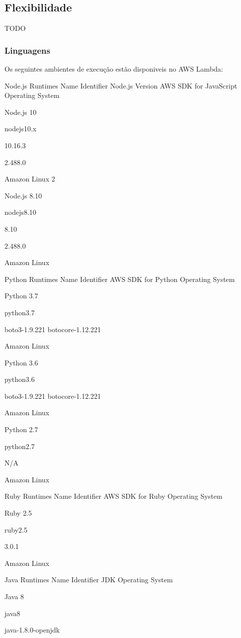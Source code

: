 \subsection{Flexibilidade}

TODO

\subsubsection{Linguagens}

Os seguintes ambientes de execução estão disponiveis no AWS Lambda:

Node.js Runtimes
Name	Identifier	Node.js Version 	AWS SDK for JavaScript
Operating System

Node.js 10

nodejs10.x

10.16.3

2.488.0

Amazon Linux 2

Node.js 8.10

nodejs8.10

8.10

2.488.0

Amazon Linux

Python Runtimes
Name	Identifier	AWS SDK for Python	Operating System

Python 3.7

python3.7

boto3-1.9.221 botocore-1.12.221

Amazon Linux

Python 3.6

python3.6

boto3-1.9.221 botocore-1.12.221

Amazon Linux

Python 2.7

python2.7

N/A

Amazon Linux

Ruby Runtimes
Name	Identifier	AWS SDK for Ruby	Operating System

Ruby 2.5

ruby2.5

3.0.1

Amazon Linux

Java Runtimes
Name	Identifier	JDK	Operating System

Java 8

java8

java-1.8.0-openjdk

